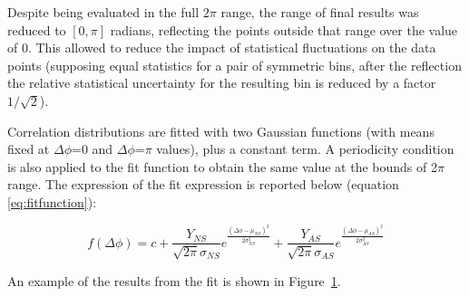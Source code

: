 Despite being evaluated in the full $2\pi$ range, the range of final results was reduced to $[0,\pi]$ radians, reflecting the points outside that range over the value of 0. This allowed to reduce the impact of statistical fluctuations on the data points (supposing equal statistics for a pair of symmetric bins, after the reflection the relative statistical uncertainty for the resulting bin is reduced by a factor $1/\sqrt{2}$).


Correlation distributions are fitted with two Gaussian functions (with means fixed at $\Delta\phi$=0 and $\Delta\phi$=$\pi$ values), plus a constant term. A  periodicity condition is also applied to the fit function to obtain the same value at the bounds of 2$\pi$ range. The expression of the fit expression is reported below (equation \ref{eq:fitfunction}):

\begin{equation}
f\left(\Delta\phi\right) = c + \frac{Y_{NS}}{\sqrt{2\pi}\sigma_{NS}}e^{\frac{\left(\Delta\phi-\mu_{NS}\right)^{2}}{2\sigma_{NS}^{2}}} + \frac{Y_{AS}}{\sqrt{2\pi}\sigma_{AS}}e^{\frac{\left(\Delta\phi-\mu_{AS}\right)^{2}}{2\sigma_{AS}^{2}}}
\label{eq:fitfunction}
\end{equation}

An example of the results from the fit is shown in Figure~\ref{fig:ExFit}.

\begin{figure}[h]
\centering
 \label{fig:ExFit}
 \end{figure}

